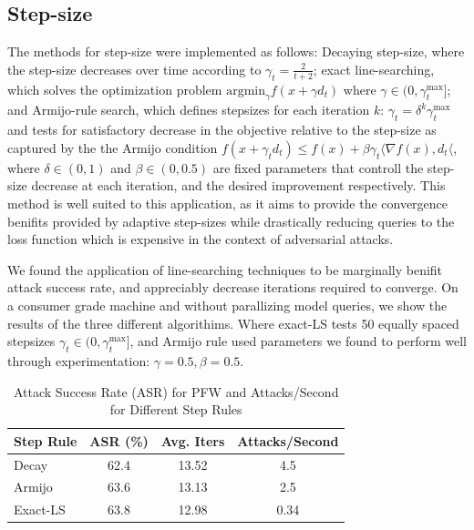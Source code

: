 \documentclass{article}
\begin{document}
\subsection{Step-size}
The methods for step-size were implemented as follows: 
 Decaying step-size, where the step-size decreases over time according to $\gamma_t = \frac{2}{t + 2}$; 
exact line-searching, which solves the optimization problem $\text{argmin}_{\gamma} f(x + \gamma d_t)$ where $\gamma \in (0,\gamma_t^\text{max}]$; 
and Armijo-rule search, which defines stepsizes for each iteration $k$: $\gamma_t = \delta^k \gamma_t^\text{max}$ and tests for satisfactory decrease  in the objective relative to the step-size as captured by the the Armijo condition $f(x + \gamma_t d_t) \leq f(x) + \beta \gamma_t \langle\nabla f(x), d_t\langle$, where $\delta \in (0,1)$ and $\beta \in (0, 0.5)$ are fixed parameters that controll the step-size decrease at each iteration, and the desired improvement respectively. This method is well suited to this application, as it aims to provide the convergence benifits provided by adaptive step-sizes while drastically reducing queries to the loss function which is expensive in the context of adversarial attacks.

We found the application of line-searching techniques to be marginally benifit attack success rate, and appreciably decrease iterations required to converge. 
On a consumer grade machine and without parallizing model queries, we show the results of the three different algorithims. Where exact-LS tests 50 equally spaced stepsizes $\gamma_t \in (0, \gamma_t^\text{max}]$, and Armijo rule used parameters we found to perform well through experimentation: $\gamma = 0.5, \beta = 0.5$.

\begin{table}[H]
\centering
\begin{tabular}{lccc}
\toprule
\textbf{Step Rule} & \textbf{ASR (\%)} & \textbf{Avg. Iters} & \textbf{Attacks/Second} \\
\midrule
Decay  & 62.4 & 13.52 & 4.5 \\
Armijo & 63.6 & 13.13 & 2.5 \\
Exact-LS & 63.8 & 12.98 & 0.34 \\
\bottomrule
\end{tabular}
\caption{Attack Success Rate (ASR) for PFW and Attacks/Second for Different Step Rules}
\label{table:asr_step_rules}
\end{table}
\end{document}
